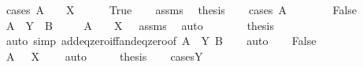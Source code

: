 \begin{isabellebody}
\isamarkupfalse%
\ {\isacharparenleft}{\kern0pt}cases\ {\isachardoublequoteopen}A\ {\isacharequal}{\kern0pt}\ {}\ {\isasymor}\ X\ {\isacharequal}{\kern0pt}\ {}{\isachardoublequoteclose}{\isacharparenright}{\kern0pt}\isanewline
\ \ \isamarkupfalse%
\ True\isanewline
\ \ \isamarkupfalse%
\ assms\ \isamarkupfalse%
\ {\isacharquery}{\kern0pt}thesis\isanewline
\ \ \isamarkupfalse%
\ {\isacharparenleft}{\kern0pt}cases\ {\isachardoublequoteopen}A\ {\isacharequal}{\kern0pt}\ {}{\isachardoublequoteclose}{\isacharparenright}{\kern0pt}\isanewline
\ \ \ \ \isamarkupfalse%
\ False\isanewline
\ \ \ \ \isamarkupfalse%
\ \isamarkupfalse%
\ {\isachardoublequoteopen}A\ {\isacharasterisk}{\kern0pt}\ Y\ {\isacharplus}{\kern0pt}\ B\ {\isacharequal}{\kern0pt}\ {}{\isachardoublequoteclose}\ \isamarkupfalse%
\ \ {\isacartoucheopen}A\ {\isacharequal}{\kern0pt}\ {}\ {\isasymor}\ X\ {\isacharequal}{\kern0pt}\ {}{\isacartoucheclose}\ assms\ \isamarkupfalse%
\ auto\isanewline
\ \ \ \ \isamarkupfalse%
\ \isamarkupfalse%
\ {\isacharquery}{\kern0pt}thesis\isanewline
\ \ \ \ \ \ \isamarkupfalse%
\ {\isacharparenleft}{\kern0pt}auto\ simp{\isacharcolon}{\kern0pt}\ add{\isacharunderscore}{\kern0pt}eq{\isacharunderscore}{\kern0pt}zero{\isacharunderscore}{\kern0pt}iff{\isacharunderscore}{\kern0pt}and{\isacharunderscore}{\kern0pt}eq{\isacharunderscore}{\kern0pt}zero{\isacharbrackleft}{\kern0pt}of\ {\isachardoublequoteopen}A\ {\isacharasterisk}{\kern0pt}\ Y{\isachardoublequoteclose}\ {\isachardoublequoteopen}B{\isachardoublequoteclose}{\isacharbrackright}{\kern0pt}{\isacharparenright}{\kern0pt}\isanewline
\ \ \isamarkupfalse%
\ auto\isanewline
{}\isamarkupfalse%
\isanewline
\ \ \isamarkupfalse%
\ False\isanewline
\ \ \isamarkupfalse%
\ \isamarkupfalse%
\ {\isachardoublequoteopen}A\ {\isasymnoteq}\ {}{\isachardoublequoteclose}\ {\isachardoublequoteopen}X\ {\isasymnoteq}\ {}{\isachardoublequoteclose}\ \isamarkupfalse%
\ auto\isanewline
\ \ \isamarkupfalse%
\ \isamarkupfalse%
\ {\isacharquery}{\kern0pt}thesis\isanewline
\ \ \isamarkupfalse%
\ {\isacharparenleft}{\kern0pt}cases{\isachardoublequoteopen}Y\ {\isacharequal}{\kern0pt}\ {}{\isachardoublequoteclose}{\isacharparenright}{\kern0pt}\isanewline

\end{isabellebody}
